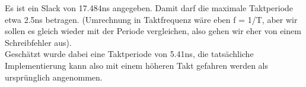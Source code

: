 \documentclass[a4paper]{scrartcl}
\begin{document}
\begin{enumerate}[(a)]
	Es ist ein Slack von 17.484ns angegeben. Damit darf die maximale Taktperiode etwa 2.5ns betragen. (Umrechnung in Taktfrequenz wäre eben f = 1/T, aber wir sollen es gleich wieder mit der Periode vergleichen, also gehen wir eher von einem Schreibfehler aus).\\
	Geschätzt wurde dabei eine Taktperiode von 5.41ns, die tatsächliche Implementierung kann also mit einem höheren Takt gefahren werden als ursprünglich angenommen.
\end{enumerate}

	
\end{document}
